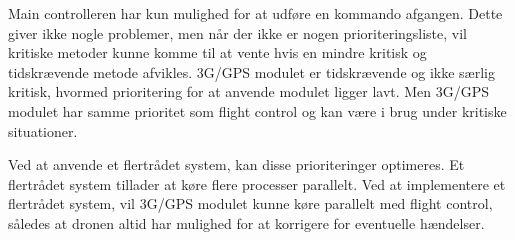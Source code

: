 Main controlleren har kun mulighed for at udføre en kommando afgangen. Dette giver ikke nogle problemer, men når der ikke er nogen prioriteringsliste, vil kritiske metoder kunne komme til at vente hvis en mindre kritisk og tidskrævende metode afvikles. 
3G/GPS modulet er tidskrævende og ikke særlig kritisk, hvormed prioritering for at anvende modulet ligger lavt. Men 3G/GPS modulet har samme prioritet som flight control og kan være i brug under kritiske situationer. 

Ved at anvende et flertrådet system, kan disse prioriteringer optimeres. Et flertrådet system tillader at køre flere processer parallelt. Ved at implementere et flertrådet system, vil 3G/GPS modulet kunne køre parallelt med flight control, således at dronen altid har mulighed for at korrigere for eventuelle hændelser. 


